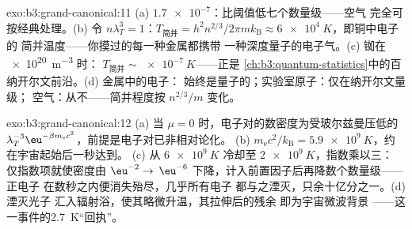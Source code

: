 \begin{solution}{exo:b3:grand-canonical:11}
(a) $\num{1.7e-7}$：比阈值低七个数量级——空气
完全可按经典处理。(b) 令 $n\lambda_T^3 = 1$：$T_{\text{简并}} =
h^2n^{2/3}/2\pi mk_{\text{B}} \approx \qty{6e4}{K}$，即铜中电子的
简并温度——你摸过的每一种金属都携带
一种深度量子的电子气。(c) 铷在 \qty{e20}{m^{-3}} 时：
$T_{\text{简并}} \sim \qty{e-7}{K}$——正是
\cref{ch:b3:quantum-statistics}中的百纳开尔文前沿。(d) 金属中的电子：
始终是量子的；实验室原子：仅在纳开尔文量级；
空气：从不——简并程度按 $n^{2/3}/m$ 变化。
\end{solution}

\begin{solution}{exo:b3:grand-canonical:12}
(a) 当 $\mu = 0$ 时，电子对的数密度为受玻尔兹曼压低的
$\lambda_T^{-3}\eu^{-\beta m_{\text{e}}c^2}$，前提是电子对已非相对论化。
(b) $m_{\text{e}}c^2/k_{\text{B}} =
\qty{5.9e9}{K}$，约在宇宙起始后一秒达到。
(c) 从 $\qty{6e9}{K}$ 冷却至 $\qty{2e9}{K}$，指数乘以三：
仅指数项就使密度由 $\eu^{-2} \to$
$\eu^{-6}$ 下降，计入前置因子后再降数个数量级——正电子
在数秒之内便消失殆尽，几乎所有电子
都与之湮灭，只余十亿分之一。(d) 湮灭光子
汇入辐射浴，使其略微升温，其拉伸后的残余
即为宇宙微波背景
——这一事件的\qty{2.7}{K}“回执”。
\end{solution}

